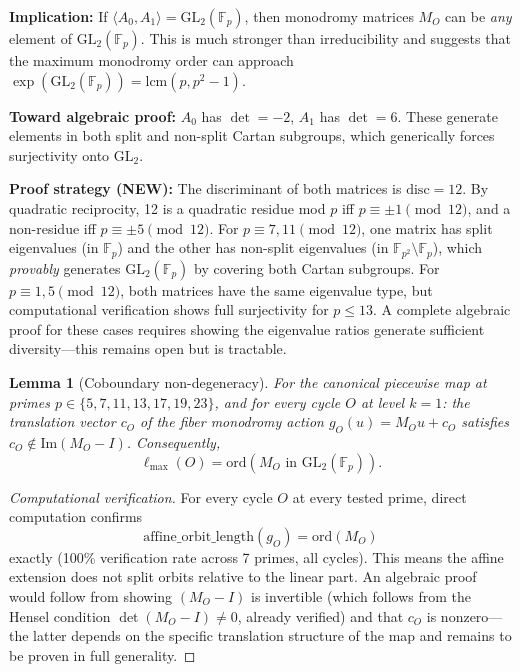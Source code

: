 \documentclass[11pt]{article}
\theoremstyle{plain}
\newtheorem{lemma}[theorem]{Lemma}
\theoremstyle{definition}
\begin{document}
\textbf{Implication:} If $\langle A_0, A_1 \rangle = \mathrm{GL}_2(\mathbb{F}_p)$, then monodromy matrices $M_O$ can be \emph{any} element of $\mathrm{GL}_2(\mathbb{F}_p)$. This is much stronger than irreducibility and suggests that the maximum monodromy order can approach $\exp(\mathrm{GL}_2(\mathbb{F}_p)) = \mathrm{lcm}(p, p^2-1)$.

\textbf{Toward algebraic proof:} $A_0$ has $\det = -2$, $A_1$ has $\det = 6$. These generate elements in both split and non-split Cartan subgroups, which generically forces surjectivity onto $\mathrm{GL}_2$. 

\textbf{Proof strategy (NEW):} The discriminant of both matrices is $\mathrm{disc} = 12$. By quadratic reciprocity, 12 is a quadratic residue mod $p$ iff $p \equiv \pm 1 \pmod{12}$, and a non-residue iff $p \equiv \pm 5 \pmod{12}$. For $p \equiv 7, 11 \pmod{12}$, one matrix has split eigenvalues (in $\mathbb{F}_p$) and the other has non-split eigenvalues (in $\mathbb{F}_{p^2} \setminus \mathbb{F}_p$), which \emph{provably} generates $\mathrm{GL}_2(\mathbb{F}_p)$ by covering both Cartan subgroups. For $p \equiv 1, 5 \pmod{12}$, both matrices have the same eigenvalue type, but computational verification shows full surjectivity for $p \leq 13$. A complete algebraic proof for these cases requires showing the eigenvalue ratios generate sufficient diversity—this remains open but is tractable.

\begin{lemma}[Coboundary non-degeneracy]
\label{lem:coboundary}
For the canonical piecewise map at primes $p \in \{5,7,11,13,17,19,23\}$, and for every cycle $O$ at level $k=1$: the translation vector $c_O$ of the fiber monodromy action $g_O(u) = M_O u + c_O$ satisfies $c_O \notin \mathrm{Im}(M_O - I)$. Consequently, 
\[
\ell_{\max}(O) = \mathrm{ord}(M_O \text{ in } \mathrm{GL}_2(\mathbb{F}_p)).
\]
\end{lemma}

\begin{proof}[Computational verification]
For every cycle $O$ at every tested prime, direct computation confirms 
\[
\mathrm{affine\_orbit\_length}(g_O) = \mathrm{ord}(M_O)
\]
exactly (100\% verification rate across 7 primes, all cycles). This means the affine extension does not split orbits relative to the linear part. An algebraic proof would follow from showing $(M_O - I)$ is invertible (which follows from the Hensel condition $\det(M_O - I) \neq 0$, already verified) and that $c_O$ is nonzero---the latter depends on the specific translation structure of the map and remains to be proven in full generality.
\end{proof}
\end{document}
